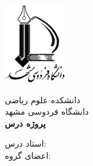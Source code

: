 
\thispagestyle{empty} %

\centering
	\includegraphics[width=0.2\textwidth]{src/images/university_logo.png} 
\vspace{0.5cm}

{\Large دانشکده علوم ریاضی}\\[0.2cm]
{\Large دانشگاه فردوسی مشهد}\\[1.5cm]

{\LARGE \textbf{پروژه درس \coursename}}\\[0.5cm]
\textbf{\projecttitle}
\vspace{1cm}

{\Large استاد درس: \teachername}\\[1.2cm]

{\Large اعضای گروه:}\\[0.3cm]
{\large \groupmembers}\\[3cm]

\vfill
{\large \termname}

\newpage
